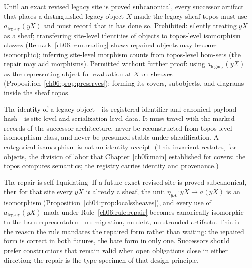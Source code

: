 \begin{ruleenv}\label{ch06:rule:repair}
Until an exact revised legacy site is proved subcanonical, every successor
artifact that places a distinguished legacy object $X$ inside the legacy
sheaf topos must use $a_{\mathrm{legacy}}(yX)$ and must record that it has
done so. Prohibited: silently treating $yX$ as a sheaf; transferring
site-level identities of objects to topos-level isomorphism classes
(Remark~\ref{ch06:rem:reading} shows repaired objects may become
isomorphic); inferring site-level morphism counts from topos-level
hom-sets (the repair may add morphisms). Permitted without further proof:
using $a_{\mathrm{legacy}}(yX)$ as the representing object for evaluation
at $X$ on sheaves (Proposition~\ref{ch06:prop:preserves}); forming its
covers, subobjects, and diagrams inside the sheaf topos.
\end{ruleenv}

\begin{invariant}
\label{ch06:inv:identity}
The identity of a legacy object---its registered identifier and canonical
payload hash---is site-level and serialization-level data. It must travel
with the marked records of the successor architecture, never be
reconstructed from topos-level isomorphism class, and never be presumed
stable under sheafification. A categorical isomorphism is not an identity
receipt. (This invariant restates, for objects, the division of labor that
Chapter~\ref{ch05:main} established for covers: the topos computes
semantics; the registry carries identity and provenance.)
\end{invariant}

\begin{remark}\label{ch06:rem:dissolve}
The repair is self-liquidating. If a future exact revised site is proved
subcanonical, then for that site every $yX$ is already a sheaf, the unit
$\eta_{yX}:yX\to a(yX)$ is an isomorphism
(Proposition~\ref{ch04:prop:localssheaves}), and every use of
$a_{\mathrm{legacy}}(yX)$ made under Rule~\ref{ch06:rule:repair} becomes
canonically isomorphic to the bare representable---no migration, no debt,
no stranded artifacts. This is the reason the rule mandates the repaired
form rather than waiting: the repaired form is correct in both futures,
the bare form in only one. Successors should prefer constructions that
remain valid when open obligations close in either direction; the repair
is the type specimen of that design principle.
\end{remark}

